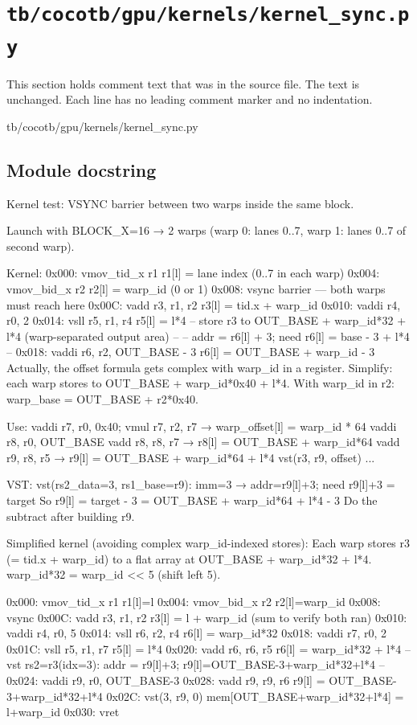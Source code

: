 \section{\texttt{tb/cocotb/gpu/kernels/kernel\_sync.py}}\label{tm:suite:gpu-kernels-kernel-sync}

This section holds comment text that was in the source file. The text is unchanged. Each line has no leading comment marker and no indentation.

\begin{relocated}{tb/cocotb/gpu/kernels/kernel_sync.py}

\subsection*{Module docstring}

\begin{textblock}
Kernel test: VSYNC barrier between two warps inside the same block.

Launch with BLOCK_X=16 → 2 warps (warp 0: lanes 0..7, warp 1: lanes 0..7 of second warp).

Kernel:
0x000: vmov_tid_x r1    r1[l] = lane index (0..7 in each warp)
0x004: vmov_bid_x r2    r2[l] = warp_id (0 or 1)
0x008: vsync            barrier — both warps must reach here
0x00C: vadd r3, r1, r2  r3[l] = tid.x + warp_id
0x010: vaddi r4, r0, 2
0x014: vsll  r5, r1, r4  r5[l] = l*4
-- store r3 to OUT_BASE + warp_id*32 + l*4 (warp-separated output area) --
-- addr = r6[l] + 3; need r6[l] = base - 3 + l*4                        --
0x018: vaddi r6, r2, OUT_BASE - 3   r6[l] = OUT_BASE + warp_id - 3
Actually, the offset formula gets complex with warp_id in a register.
Simplify: each warp stores to OUT_BASE + warp_id*0x40 + l*4.
With warp_id in r2: warp_base = OUT_BASE + r2*0x40.

Use: vaddi r7, r0, 0x40; vmul r7, r2, r7  → warp_offset[l] = warp_id * 64
vaddi r8, r0, OUT_BASE
vadd  r8, r8, r7    → r8[l] = OUT_BASE + warp_id*64
vadd  r9, r8, r5    → r9[l] = OUT_BASE + warp_id*64 + l*4
vst(r3, r9, offset) ...

VST: vst(rs2_data=3, rs1_base=r9): imm=3 → addr=r9[l]+3; need r9[l]+3 = target
So r9[l] = target - 3 = OUT_BASE + warp_id*64 + l*4 - 3
Do the subtract after building r9.

Simplified kernel (avoiding complex warp_id-indexed stores):
Each warp stores r3 (= tid.x + warp_id) to a flat array at OUT_BASE + warp_id*32 + l*4.
warp_id*32 = warp_id << 5 (shift left 5).

0x000: vmov_tid_x r1      r1[l]=l
0x004: vmov_bid_x r2      r2[l]=warp_id
0x008: vsync
0x00C: vadd r3, r1, r2    r3[l] = l + warp_id  (sum to verify both ran)
0x010: vaddi r4, r0, 5
0x014: vsll  r6, r2, r4   r6[l] = warp_id*32
0x018: vaddi r7, r0, 2
0x01C: vsll  r5, r1, r7   r5[l] = l*4
0x020: vadd  r6, r6, r5   r6[l] = warp_id*32 + l*4
-- vst rs2=r3(idx=3): addr = r9[l]+3; r9[l]=OUT_BASE-3+warp_id*32+l*4 --
0x024: vaddi r9, r0, OUT_BASE-3
0x028: vadd  r9, r9, r6   r9[l] = OUT_BASE-3+warp_id*32+l*4
0x02C: vst(3, r9, 0)      mem[OUT_BASE+warp_id*32+l*4] = l+warp_id
0x030: vret
\end{textblock}

\end{relocated}

